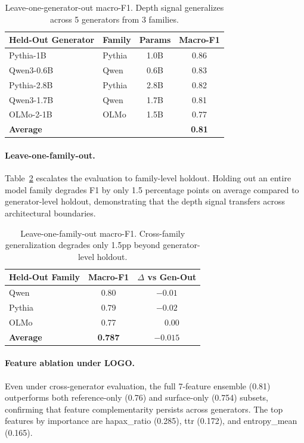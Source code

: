 \documentclass[11pt,a4paper]{article}
\begin{document}
\begin{table}[t]
\centering
\caption{Leave-one-generator-out macro-F1. Depth signal generalizes across 5 generators from 3 families.}
\label{tab:logo_gen}
\begin{tabular}{llcc}
\toprule
Held-Out Generator & Family & Params & Macro-F1 \\
\midrule
Pythia-1B & Pythia & 1.0B & 0.86 \\
Qwen3-0.6B & Qwen & 0.6B & 0.83 \\
Pythia-2.8B & Pythia & 2.8B & 0.82 \\
Qwen3-1.7B & Qwen & 1.7B & 0.81 \\
OLMo-2-1B & OLMo & 1.5B & 0.77 \\
\midrule
\textbf{Average} & & & \textbf{0.81} \\
\bottomrule
\end{tabular}
\end{table}

\paragraph{Leave-one-family-out.} Table~\ref{tab:logo_fam} escalates the evaluation to family-level holdout. Holding out an entire model family degrades F1 by only 1.5 percentage points on average compared to generator-level holdout, demonstrating that the depth signal transfers across architectural boundaries.

\begin{table}[t]
\centering
\caption{Leave-one-family-out macro-F1. Cross-family generalization degrades only 1.5pp beyond generator-level holdout.}
\label{tab:logo_fam}
\begin{tabular}{lcc}
\toprule
Held-Out Family & Macro-F1 & $\Delta$ vs Gen-Out \\
\midrule
Qwen & 0.80 & $-0.01$ \\
Pythia & 0.79 & $-0.02$ \\
OLMo & 0.77 & $\phantom{-}0.00$ \\
\midrule
\textbf{Average} & \textbf{0.787} & \textbf{$-0.015$} \\
\bottomrule
\end{tabular}
\end{table}

\paragraph{Feature ablation under LOGO.} Even under cross-generator evaluation, the full 7-feature ensemble (0.81) outperforms both reference-only (0.76) and surface-only (0.754) subsets, confirming that feature complementarity persists across generators. The top features by importance are hapax\_ratio (0.285), ttr (0.172), and entropy\_mean (0.165).
\end{document}
